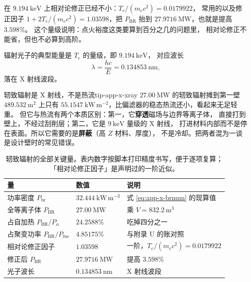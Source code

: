 在 $9.194\ \mathrm{keV}$ 上相对论修正已经不小：$T_e/(m_ec^2)=0.0179922$，
常用的以及修正因子 $1+2T_e/(m_ec^2)=1.03598$，把 $P_{\mathrm{BR}}$
抬到 $27.9716\ \mathrm{MW}$，也就是提高 $3.598\%$。
这个量级说明：点火裕度这类要算到百分之几的问题里，
相对论修正不能省，但也不必算到高阶。

辐射光子的典型能量是 $T_e$ 的量级，即 $9.194\ \mathrm{keV}$，
对应波长
\begin{equation}
\lambda = \frac{hc}{E} = 0.134853\ \mathrm{nm},
\label{eq:app-x-photon}
\end{equation}
落在 X 射线波段。

\begin{tip}{轫致辐射是 X 射线，不是热流}{tip-app-x-xray}
$27.00\ \mathrm{MW}$ 的轫致辐射摊到第一壁 $489.532\ \mathrm{m^2}$ 上只有
$55.1547\ \mathrm{kW\,m^{-2}}$，比偏滤器的稳态热流还小，看起来无足轻重。
但它与热流有两个本质区别：第一，它\textbf{穿透}磁场与边界等离子体，
直接打到壁上，不经过刮削层；第二，它是 $9\ \mathrm{keV}$ 量级的 X 射线，
打进材料内部而不是停在表面。所以它需要的是\textbf{屏蔽}（高 $Z$ 材料、厚度），
不是冷却。把两者混为一谈是设计壁时的常见错误。
\end{tip}

\begin{table}[htbp]
\centering
\small
\caption{轫致辐射的全部关键量。表内数字按脚本打印精度书写，便于逐项复算；
「相对论修正因子」是声明过的一阶近似。}
\label{tab:app-x-brems}
\begin{tabular}{p{4.4cm}p{3.4cm}p{4.8cm}}
\toprule
量 & 数值 & 说明 \\
\midrule
功率密度 $P_{\mathrm{br}}$ & $32.444\ \mathrm{kW\,m^{-3}}$ & 式 \eqref{eq:app-x-brnum} 的现算值 \\
全等离子体 $P_{\mathrm{BR}}$ & $27.00\ \mathrm{MW}$ & 乘 $V=832.2\ \mathrm{m^3}$ \\
占自加热 $P_{\mathrm{BR}}/P_\alpha$ & $24.2588\%$ & 吃掉四分之一 \\
占聚变功率 $P_{\mathrm{BR}}/P_{\mathrm{fus}}$ & $4.85175\%$ & 与附录 U 的账对照 \\
相对论修正因子 & $1.03598$ & 一阶，$T_e/(m_ec^2)=0.0179922$ \\
修正后 $P_{\mathrm{BR}}$ & $27.9716\ \mathrm{MW}$ & 提高 $3.598\%$ \\
光子波长 & $0.134853\ \mathrm{nm}$ & X 射线波段 \\
\bottomrule
\end{tabular}

\end{table}


